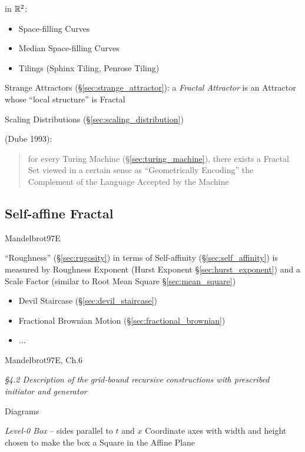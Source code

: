 in $\mathbb{R}^2$:
\begin{itemize}
  \item Space-filling Curves
  \item Median Space-filling Curves
  \item Tilings (Sphinx Tiling, Penrose Tiling)
\end{itemize}

\fist Strange Attractors (\S\ref{sec:strange_attractor}): a \emph{Fractal
  Attractor} is an Attractor whose ``local structure'' is Fractal

\fist Scaling Distributions (\S\ref{sec:scaling_distribution})

\asterism

(Dube 1993):
\begin{quote}
  for every Turing Machine (\S\ref{sec:turing_machine}), there exists a Fractal
  Set viewed in a certain sense as ``Geometrically Encoding'' the Complement of
  the Language Accepted by the Machine
\end{quote}



\subsection{Self-affine Fractal}\label{sec:selfaffine_fractal}

Mandelbrot97E

``Roughness'' (\S\ref{sec:rugosity}) in terms of Self-affinity
(\S\ref{sec:self_affinity}) is measured by Roughness Exponent (Hurst Exponent
\S\ref{sec:hurst_exponent}) and a Scale Factor (similar to Root Mean Square
\S\ref{sec:mean_square})

\begin{itemize}
  \item Devil Staircase (\S\ref{sec:devil_staircase})
  \item Fractional Brownian Motion (\S\ref{sec:fractional_brownian})
  \item ...
\end{itemize}

Mandelbrot97E, Ch.6

\emph{\S 4.2 Description of the grid-bound recursive constructions with
  prescribed initiator and generator}

Diagrams

\emph{Level-0 Box} -- sides parallel to $t$ and $x$ Coordinate axes with width
and height chosen to make the box a Square in the Affine Plane

